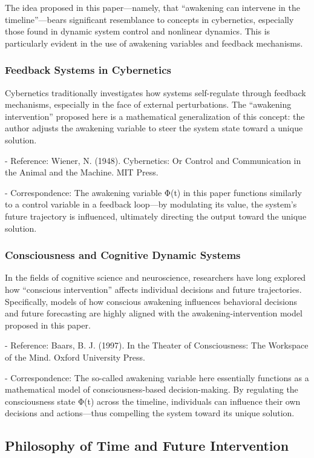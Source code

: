 \documentclass{article}
\begin{document}
The idea proposed in this paper—namely, that “awakening can intervene in the timeline”—bears significant resemblance to concepts in cybernetics, especially those found in dynamic system control and nonlinear dynamics. This is particularly evident in the use of awakening variables and feedback mechanisms.

\subsubsection{Feedback Systems in Cybernetics}

Cybernetics traditionally investigates how systems self-regulate through feedback mechanisms, especially in the face of external perturbations. The “awakening intervention” proposed here is a mathematical generalization of this concept: the author adjusts the awakening variable to steer the system state toward a unique solution.

- Reference: Wiener, N. (1948). Cybernetics: Or Control and Communication in the Animal and the Machine. MIT Press.

- Correspondence: The awakening variable Φ(t) in this paper functions similarly to a control variable in a feedback loop—by modulating its value, the system’s future trajectory is influenced, ultimately directing the output toward the unique solution.

\subsubsection{Consciousness and Cognitive Dynamic Systems}

In the fields of cognitive science and neuroscience, researchers have long explored how “conscious intervention” affects individual decisions and future trajectories. Specifically, models of how conscious awakening influences behavioral decisions and future forecasting are highly aligned with the awakening-intervention model proposed in this paper.

- Reference: Baars, B. J. (1997). In the Theater of Consciousness: The Workspace of the Mind. Oxford University Press.

- Correspondence: The so-called awakening variable here essentially functions as a mathematical model of consciousness-based decision-making. By regulating the consciousness state Φ(t) across the timeline, individuals can influence their own decisions and actions—thus compelling the system toward its unique solution.

\subsection{Philosophy of Time and Future Intervention}
\end{document}
